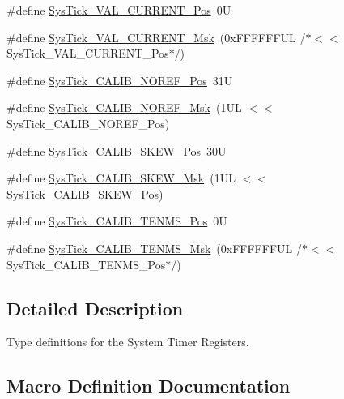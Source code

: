 \begin{DoxyCompactItemize}
\item 
\#define \hyperlink{group___c_m_s_i_s___sys_tick_ga3208104c3b019b5de35ae8c21d5c34dd}{Sys\+Tick\+\_\+\+V\+A\+L\+\_\+\+C\+U\+R\+R\+E\+N\+T\+\_\+\+Pos}~0U
\item 
\#define \hyperlink{group___c_m_s_i_s___sys_tick_gafc77b56d568930b49a2474debc75ab45}{Sys\+Tick\+\_\+\+V\+A\+L\+\_\+\+C\+U\+R\+R\+E\+N\+T\+\_\+\+Msk}~(0x\+F\+F\+F\+F\+F\+F\+U\+L /$\ast$$<$$<$ Sys\+Tick\+\_\+\+V\+A\+L\+\_\+\+C\+U\+R\+R\+E\+N\+T\+\_\+\+Pos$\ast$/)
\item 
\#define \hyperlink{group___c_m_s_i_s___sys_tick_ga534dbe414e7a46a6ce4c1eca1fbff409}{Sys\+Tick\+\_\+\+C\+A\+L\+I\+B\+\_\+\+N\+O\+R\+E\+F\+\_\+\+Pos}~31U
\item 
\#define \hyperlink{group___c_m_s_i_s___sys_tick_ga3af0d891fdd99bcc8d8912d37830edb6}{Sys\+Tick\+\_\+\+C\+A\+L\+I\+B\+\_\+\+N\+O\+R\+E\+F\+\_\+\+Msk}~(1\+U\+L $<$$<$ Sys\+Tick\+\_\+\+C\+A\+L\+I\+B\+\_\+\+N\+O\+R\+E\+F\+\_\+\+Pos)
\item 
\#define \hyperlink{group___c_m_s_i_s___sys_tick_gadd0c9cd6641b9f6a0c618e7982954860}{Sys\+Tick\+\_\+\+C\+A\+L\+I\+B\+\_\+\+S\+K\+E\+W\+\_\+\+Pos}~30U
\item 
\#define \hyperlink{group___c_m_s_i_s___sys_tick_ga8a6a85a87334776f33d77fd147587431}{Sys\+Tick\+\_\+\+C\+A\+L\+I\+B\+\_\+\+S\+K\+E\+W\+\_\+\+Msk}~(1\+U\+L $<$$<$ Sys\+Tick\+\_\+\+C\+A\+L\+I\+B\+\_\+\+S\+K\+E\+W\+\_\+\+Pos)
\item 
\#define \hyperlink{group___c_m_s_i_s___sys_tick_gacae558f6e75a0bed5d826f606d8e695e}{Sys\+Tick\+\_\+\+C\+A\+L\+I\+B\+\_\+\+T\+E\+N\+M\+S\+\_\+\+Pos}~0U
\item 
\#define \hyperlink{group___c_m_s_i_s___sys_tick_gaf1e68865c5aece2ad58971225bd3e95e}{Sys\+Tick\+\_\+\+C\+A\+L\+I\+B\+\_\+\+T\+E\+N\+M\+S\+\_\+\+Msk}~(0x\+F\+F\+F\+F\+F\+F\+U\+L /$\ast$$<$$<$ Sys\+Tick\+\_\+\+C\+A\+L\+I\+B\+\_\+\+T\+E\+N\+M\+S\+\_\+\+Pos$\ast$/)
\end{DoxyCompactItemize}


\subsection{Detailed Description}
Type definitions for the System Timer Registers. 



\subsection{Macro Definition Documentation}
\mbox{\label{group___c_m_s_i_s___sys_tick_ga3af0d891fdd99bcc8d8912d37830edb6}} 
